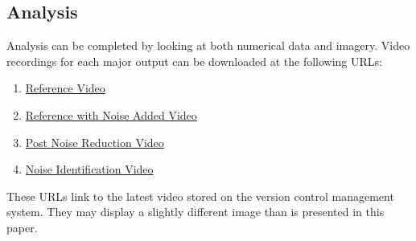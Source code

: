 \subsection{Analysis}
Analysis can be completed by looking at both numerical data and imagery.
Video recordings for each major output can be downloaded at the following URLs:
\begin{enumerate}\label{list:urlList}
    \item \hyperlink{https://github.com/dgaiero/cpe-446-final-paper/blob/master/design/video-output/compressed/reference.m4v}{Reference Video}
    \item \hyperlink{https://github.com/dgaiero/cpe-446-final-paper/blob/master/design/video-output/compressed/noisyImage.m4v}{Reference with Noise Added Video}
    \item \hyperlink{https://github.com/dgaiero/cpe-446-final-paper/blob/master/design/video-output/compressed/PostNR.m4v}{Post Noise Reduction Video}
    \item \hyperlink{https://github.com/dgaiero/cpe-446-final-paper/blob/master/design/video-output/compressed/noiseIdentification.m4v}{Noise Identification Video}
\end{enumerate}
These URLs link to the latest video stored on the version control management system. They may display a slightly different image than is presented in this paper.
